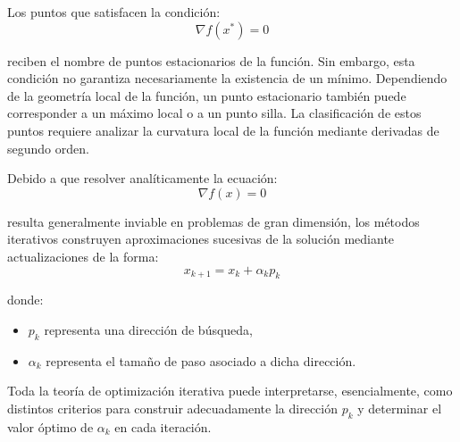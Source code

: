 Los puntos que satisfacen la condición:
\[
\nabla f(x^*) = 0
\]

reciben el nombre de puntos estacionarios de la función. Sin embargo, esta condición no garantiza necesariamente la existencia de un mínimo. Dependiendo de la geometría local de la función, un punto estacionario también puede corresponder a un máximo local o a un punto silla. La clasificación de estos puntos requiere analizar la curvatura local de la función mediante derivadas de segundo orden.

Debido a que resolver analíticamente la ecuación:
\[
\nabla f(x)=0
\]

resulta generalmente inviable en problemas de gran dimensión, los métodos iterativos construyen aproximaciones sucesivas de la solución mediante actualizaciones de la forma:
\[
x_{k+1}=x_k+\alpha_kp_k
\]

donde:

\begin{itemize}
    \item \(p_k\) representa una dirección de búsqueda,
    \item \(\alpha_k\) representa el tamaño de paso asociado a dicha dirección.
\end{itemize}

Toda la teoría de optimización iterativa puede interpretarse, esencialmente, como distintos criterios para construir adecuadamente la dirección \(p_k\) y determinar el valor óptimo de \(\alpha_k\) en cada iteración.

      